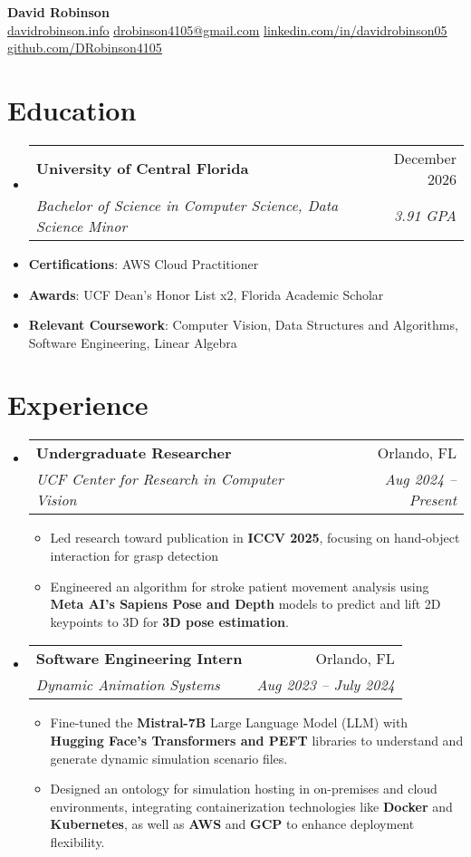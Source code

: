 \documentclass[letterpaper,11pt]{article}
\makeatletter
\newcommand{\resumeItem}[1]{
  \item\small{
    {#1 \vspace{-2pt}}
  }
}
\newcommand{\educationItem}[1]{
  \item\small{
    {#1 \vspace{-5pt}}
  }
}
\newcommand{\resumeSubheading}[4]{
  \vspace{-2pt}\item
    \begin{tabular*}{0.97\textwidth}[t]{l@{\extracolsep{\fill}}r}
      \textbf{#1} & #2 \\
      \textit{\small#3} & \textit{\small #4} \\
    \end{tabular*}\vspace{-7pt}
}
\newcommand{\resumeSubHeadingListStart}{\begin{itemize}[leftmargin=0.15in, label={}]}
\newcommand{\resumeSubHeadingListEnd}{\end{itemize}}
\newcommand{\resumeItemListStart}{\begin{itemize}}
\newcommand{\resumeItemListEnd}{\end{itemize}\vspace{-5pt}}
\makeatother
\begin{document}
\begin{center}
  \textbf{\Huge David Robinson} \\ \vspace{2pt} \small
  \faCode\hspace{0.25pt} \href{https://www.davidrobinson.info/}{\uline{davidrobinson.info}}
  \faEnvelope\hspace{0.25pt} \href{mailto:drobinson4105@gmail.com}{\uline{drobinson4105@gmail.com}}
  \faLinkedin\hspace{0.25pt} \href{https://linkedin.com/in/davidrobinson05}{\uline{linkedin.com/in/davidrobinson05}}
  \faGithub\hspace{0.25pt} \href{https://github.com/DRobinson4105}{\uline{github.com/DRobinson4105}}
\end{center}

\section{Education}
  \resumeSubHeadingListStart
    \resumeSubheading
      {University of Central Florida}{December 2026}
      {Bachelor of Science in Computer Science, Data Science Minor}{3.91 GPA}
    \educationItem{\textbf{Certifications}: AWS Cloud Practitioner}
    \educationItem{\textbf{Awards}: UCF Dean's Honor List x2, Florida Academic Scholar}
    \educationItem{\textbf{Relevant Coursework}: Computer Vision, Data Structures and Algorithms, Software Engineering, Linear Algebra}
  \resumeSubHeadingListEnd

\section{Experience}
  \resumeSubHeadingListStart
    \resumeSubheading
      {Undergraduate Researcher}{Orlando, FL}
      {UCF Center for Research in Computer Vision}{Aug 2024 -- Present}
      \resumeItemListStart
        \resumeItem{Led research toward publication in \textbf{ICCV 2025}, focusing on hand-object interaction for grasp detection}
        \resumeItem{Engineered an algorithm for stroke patient movement analysis using \textbf{Meta AI's Sapiens Pose and Depth} models to predict and lift 2D keypoints to 3D for \textbf{3D pose estimation}.}
      \resumeItemListEnd
    \resumeSubheading
      {Software Engineering Intern}{Orlando, FL}
      {Dynamic Animation Systems}{Aug 2023 -- July 2024}
      \resumeItemListStart
        \resumeItem{Fine-tuned the \textbf{Mistral-7B} Large Language Model (LLM) with \textbf{Hugging Face's Transformers and PEFT} libraries to understand and generate dynamic simulation scenario files.}
        \resumeItem{Designed an ontology for simulation hosting in on-premises and cloud environments, integrating containerization technologies like \textbf{Docker} and \textbf{Kubernetes}, as well as \textbf{AWS} and \textbf{GCP} to enhance deployment flexibility.}
      \resumeItemListEnd
  \resumeSubHeadingListEnd
\end{document}
